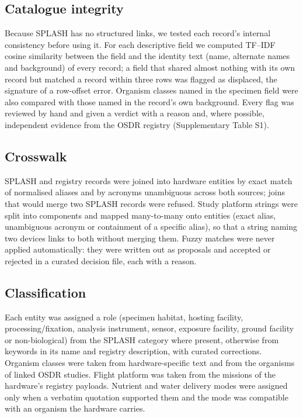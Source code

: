 \documentclass[11pt]{article}
\begin{document}
\subsection{Catalogue integrity}
Because SPLASH has no structured links, we tested each record's internal consistency before using it.
For each descriptive field we computed TF--IDF cosine similarity between the field and the identity text
(name, alternate names and background) of every record; a field that shared almost nothing with its own
record but matched a record within three rows was flagged as displaced, the signature of a row-offset
error. Organism classes named in the specimen field were also compared with those named in the
record's own background. Every flag was reviewed by hand and given a verdict with a reason and, where
possible, independent evidence from the OSDR registry (Supplementary Table S1).

\subsection{Crosswalk}
SPLASH and registry records were joined into hardware entities by exact match of normalised aliases and
by acronyms unambiguous across both sources; joins that would merge two SPLASH records were refused.
Study platform strings were split into components and mapped many-to-many onto entities (exact alias,
unambiguous acronym or containment of a specific alias), so that a string naming two devices links to
both without merging them. Fuzzy matches were never applied automatically: they were written out as
proposals and accepted or rejected in a curated decision file, each with a reason.

\subsection{Classification}
Each entity was assigned a role (specimen habitat, hosting facility, processing/fixation, analysis
instrument, sensor, exposure facility, ground facility or non-biological) from the SPLASH category
where present, otherwise from keywords in its name and registry description, with curated corrections.
Organism classes were taken from hardware-specific text and from the organisms of linked OSDR studies.
Flight platform was taken from the missions of the hardware's registry payloads. Nutrient and water
delivery modes were assigned only when a verbatim quotation supported them and the mode was compatible
with an organism the hardware carries.
\end{document}
